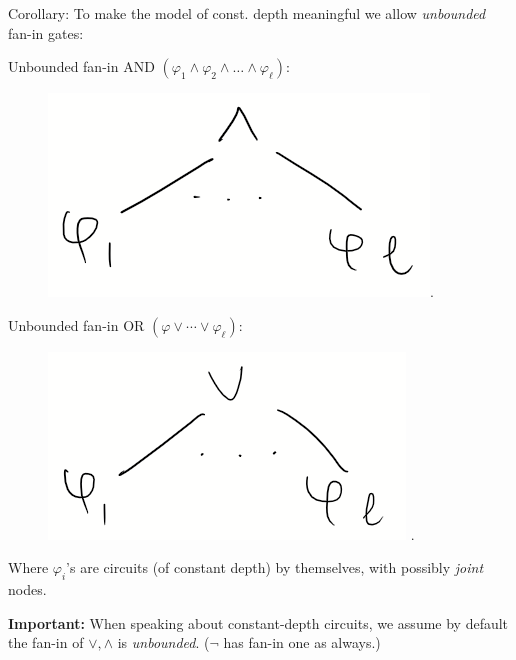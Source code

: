 Corollary: To make the model of const. depth
meaningful we allow \textit{unbounded} fan-in gates:

Unbounded fan-in AND $\left(\varphi_1 \wedge \varphi_2 \wedge \ldots \wedge \varphi_\ell\right)$:
\begin{figure}
    \centering
    \includegraphics[width=0.2\linewidth]{images/AND.png}.
    \label{fig:enter-label}
\end{figure}

Unbounded fan-in OR $\left(\varphi\lor \cdots \lor \varphi_{\ell}\right)$:
\begin{figure}
    \centering
    \includegraphics[width=0.25\linewidth]{images/OR.png}
.
    \label{fig:enter-label}
\end{figure}
Where $\varphi_i$'s are circuits (of constant depth) by themselves, with possibly \emph{joint} nodes. 


\begin{svgraybox}
\textbf{Important:}  When speaking about constant-depth circuits, we assume by default the fan-in of $\lor, \land$ is \emph{unbounded}. ($\neg$ has fan-in one as always.)
\end{svgraybox}


